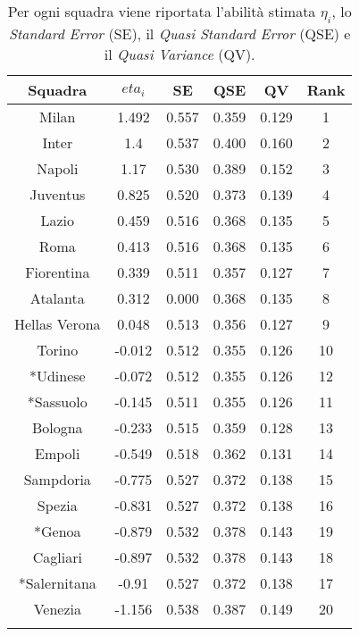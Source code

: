 	\begin{table}[!htb]%
	
	\renewcommand{\arraystretch}{1.7}
	\centering
	\begin{tabular}{c c c c c c}
		\hline	
		
		\textbf{Squadra} & \textbf{$eta_i$} & \textbf{SE} & \textbf{QSE} & \textbf{QV} & \textbf{Rank}   \\	
		\hline			
		Milan & 1.492 & 0.557 & 0.359 & 0.129 & 1\\
		Inter & 1.4 & 0.537 & 0.400 & 0.160 & 2\\
		Napoli & 1.17 & 0.530 & 0.389 & 0.152 & 3 \\
		Juventus & 0.825 & 0.520& 0.373& 0.139& 4\\
		Lazio & 0.459 & 0.516 & 0.368 & 0.135 & 5\\
		Roma & 0.413 & 0.516& 0.368& 0.135& 6\\
		Fiorentina & 0.339 & 0.511& 0.357& 0.127& 7\\
		Atalanta & 0.312 & 0.000 & 0.368& 0.135& 8 \\
		Hellas Verona & 0.048 & 0.513& 0.356& 0.127& 9\\
		Torino & -0.012 & 0.512 & 0.355& 0.126& 10 \\
		*Udinese & -0.072 & 0.512& 0.355 & 0.126& 12\\
		*Sassuolo & -0.145 & 0.511& 0.355 & 0.126& 11\\
		Bologna & -0.233 & 0.515& 0.359& 0.128& 13\\
		Empoli & -0.549 & 0.518& 0.362& 0.131& 14\\
		Sampdoria & -0.775 & 0.527& 0.372& 0.138& 15\\
		Spezia & -0.831 & 0.527& 0.372& 0.138& 16\\
		*Genoa & -0.879 & 0.532& 0.378& 0.143& 19 \\
		Cagliari & -0.897 & 0.532& 0.378& 0.143& 18\\
		*Salernitana & -0.91 & 0.527& 0.372& 0.138& 17\\
		Venezia & -1.156 & 0.538& 0.387& 0.149& 20\\
		\hline
		& & & \\
		
	\end{tabular} \hbox{}
	
	\caption{Per ogni squadra viene riportata l'abilità stimata $\eta_i$, lo \emph{Standard 
		Error} (SE), il \emph{Quasi Standard Error} (QSE) e il \emph{Quasi Variance} (QV).} \label{tab:BTH}
\end{table}
